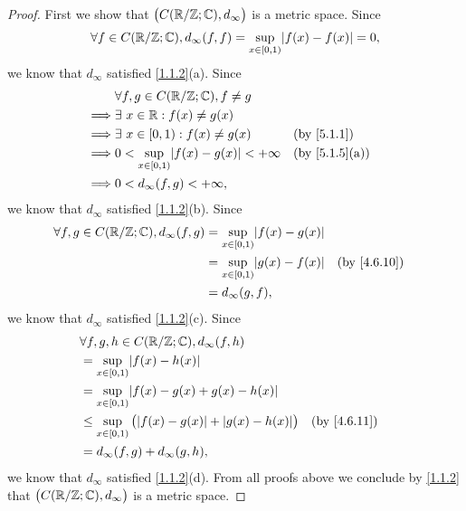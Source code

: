 \begin{proof}
  First we show that \(\big(C(\mathbb{R} / \mathbb{Z} ; \mathbb{C}), d_\infty\big)\) is a metric space.
  Since
  \[
    \forall f \in C(\R / \Z ; \C), d_\infty(f, f) = \sup_{x \in [0, 1)} \abs{f(x) - f(x)} = 0,
  \]
  we know that \(d_\infty\) satisfied \cref{1.1.2}(a).
  Since
  \begin{align*}
             & \forall f, g \in C(\R / \Z ; \C), f \neq g                                           \\
    \implies & \exists\ x \in \R : f(x) \neq g(x)                                                   \\
    \implies & \exists\ x \in [0, 1) : f(x) \neq g(x)              &  & \text{(by \cref{5.1.1})}    \\
    \implies & 0 < \sup_{x \in [0, 1)} \abs{f(x) - g(x)} < +\infty &  & \text{(by \cref{5.1.5}(a))} \\
    \implies & 0 < d_\infty(f, g) < +\infty,
  \end{align*}
  we know that \(d_\infty\) satisfied \cref{1.1.2}(b).
  Since
  \begin{align*}
    \forall f, g \in C(\R / \Z ; \C), d_\infty(f, g) & = \sup_{x \in [0, 1)} \abs{f(x) - g(x)}                                \\
                                                     & = \sup_{x \in [0, 1)} \abs{g(x) - f(x)} &  & \text{(by \cref{4.6.10})} \\
                                                     & = d_\infty(g, f),
  \end{align*}
  we know that \(d_\infty\) satisfied \cref{1.1.2}(c).
  Since
  \begin{align*}
     & \forall f, g, h \in C(\R / \Z ; \C), d_\infty(f, h)                                                     \\
     & = \sup_{x \in [0, 1)} \abs{f(x) - h(x)}                                                                 \\
     & = \sup_{x \in [0, 1)} \abs{f(x) - g(x) + g(x) - h(x)}                                                   \\
     & \leq \sup_{x \in [0, 1)} \big(\abs{f(x) - g(x)} + \abs{g(x) - h(x)}\big) &  & \text{(by \cref{4.6.11})} \\
     & = d_\infty(f, g) + d_\infty(g, h),
  \end{align*}
  we know that \(d_\infty\) satisfied \cref{1.1.2}(d).
  From all proofs above we conclude by \cref{1.1.2} that \(\big(C(\mathbb{R} / \mathbb{Z} ; \mathbb{C}), d_\infty\big)\) is a metric space.


\end{proof}
